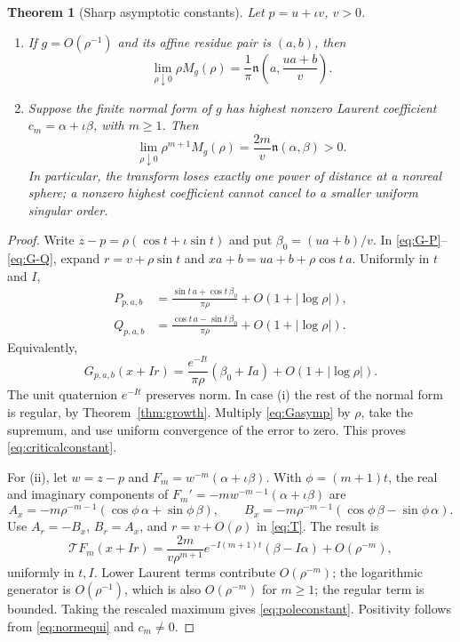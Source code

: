 \documentclass[11pt,a4paper]{article}
\numberwithin{equation}{section}
\newtheorem{theorem}{Theorem}[section]
\theoremstyle{definition}
\theoremstyle{remark}
\newcommand{\T}{\mathcal T}
\newcommand{\qnorm}{\mathfrak n}
\begin{document}
\begin{theorem}[Sharp asymptotic constants]
\label{thm:asymptotic}
Let $p=u+\iota v$, $v>0$.
\begin{enumerate}[label=\textup{(\roman*)}]
\item If $g=O(\rho^{-1})$ and its affine residue pair is $(a,b)$, then
\begin{equation}
 \lim_{\rho\downarrow0}\rho M_g(\rho)
   =\frac1\pi\qnorm\left(a,\frac{ua+b}{v}\right).
 \label{eq:criticalconstant}
\end{equation}
\item Suppose the finite normal form of $g$ has highest nonzero Laurent
coefficient $c_m=\alpha+\iota\beta$, with $m\ge1$. Then
\begin{equation}
 \lim_{\rho\downarrow0}\rho^{m+1}M_g(\rho)
   =\frac{2m}{v}\qnorm(\alpha,\beta)>0.
 \label{eq:poleconstant}
\end{equation}
In particular, the transform loses exactly one power of distance at a
nonreal sphere; a nonzero highest coefficient cannot cancel to a smaller
uniform singular order.
\end{enumerate}
\end{theorem}
\begin{proof}
Write $z-p=\rho(\cos t+\iota\sin t)$ and put
$\beta_0=(ua+b)/v$. In \eqref{eq:G-P}--\eqref{eq:G-Q}, expand
$r=v+\rho\sin t$ and $xa+b=ua+b+\rho\cos t\,a$.
Uniformly in $t$ and $I$,
\begin{align}
 P_{p,a,b}
   &=\frac{\sin t\,a+\cos t\,\beta_0}{\pi\rho}
                       +O(1+|\log\rho|),\label{eq:Pasymp}\\
 Q_{p,a,b}
   &=\frac{\cos t\,a-\sin t\,\beta_0}{\pi\rho}
                       +O(1+|\log\rho|).
 \label{eq:Qasymp}
\end{align}
Equivalently,
\begin{equation}
 G_{p,a,b}(x+Ir)
   =\frac{e^{-It}}{\pi\rho}(\beta_0+Ia)
                         +O(1+|\log\rho|).
 \label{eq:Gasymp}
\end{equation}
The unit quaternion $e^{-It}$ preserves norm. In case (i) the rest of the
normal form is regular, by Theorem~\ref{thm:growth}. Multiply
\eqref{eq:Gasymp} by $\rho$, take the supremum, and use uniform convergence
of the error to zero. This proves \eqref{eq:criticalconstant}.

For (ii), let $w=z-p$ and $F_m=w^{-m}(\alpha+\iota\beta)$.
With $\phi=(m+1)t$, the real and imaginary components of
$F_m'=-m w^{-m-1}(\alpha+\iota\beta)$ are
\[
 A_x=-m\rho^{-m-1}(\cos\phi\,\alpha+\sin\phi\,\beta),\qquad
 B_x=-m\rho^{-m-1}(\cos\phi\,\beta-\sin\phi\,\alpha).
\]
Use $A_r=-B_x$, $B_r=A_x$, and $r=v+O(\rho)$ in
\eqref{eq:T}. The result is
\begin{equation}
 \T F_m(x+Ir)=\frac{2m}{v\rho^{m+1}}
          e^{-I(m+1)t}(\beta-I\alpha)+O(\rho^{-m}),
 \label{eq:highestterm}
\end{equation}
uniformly in $t,I$. Lower Laurent terms contribute $O(\rho^{-m})$;
the logarithmic generator is $O(\rho^{-1})$, which is also
$O(\rho^{-m})$ for $m\ge1$; the regular term is bounded.
Taking the rescaled maximum gives \eqref{eq:poleconstant}. Positivity
follows from \eqref{eq:normequi} and $c_m\ne0$.
\end{proof}
\end{document}
